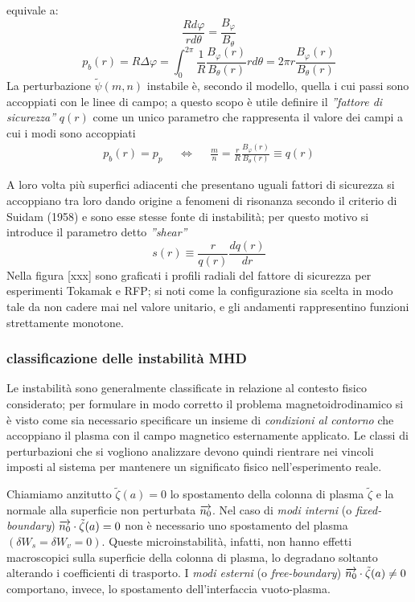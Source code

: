 equivale a: $$\frac{Rd\varphi}{rd\theta} = \frac{B_\varphi}{B_\theta}$$
$$p_b(r) = R\Delta\varphi =
\int_0^{2\pi}\frac{1}{R}\frac{B_\varphi(r)}{B_\theta(r)}rd\theta = 2\pi
r\frac{B_\varphi(r)}{B_\theta(r)}$$ La perturbazione $\tilde{\psi}(m,n)$
instabile è, secondo il modello, quella i cui passi sono accoppiati con
le linee di campo; a questo scopo è utile definire il \emph{''fattore di
sicurezza''} $q(r)$ come un unico parametro che rappresenta il valore
dei campi a cui i modi sono accoppiati
\begin{align}
 \label{sec_fact}
  p_b(r) = p_p && \Leftrightarrow &&
 \frac{m}{n} = \frac{r}{R}\frac{B_\varphi(r)}{B_\theta(r)} \equiv q(r) 
\end{align}

A loro volta più superfici adiacenti che presentano uguali fattori di
sicurezza si accoppiano tra loro dando origine a fenomeni di risonanza
secondo il criterio di Suidam (1958) e sono esse stesse fonte di
instabilità; per questo motivo si introduce il parametro detto
\emph{''shear''}
\begin{equation}
 s(r) \equiv \frac{r}{q(r)}\frac{dq(r)}{dr}
\end{equation}
Nella figura [xxx] sono graficati i profili radiali del fattore di
sicurezza per esperimenti Tokamak e RFP; si noti come la configurazione
sia scelta in modo tale da non cadere mai nel valore unitario, e gli
andamenti rappresentino funzioni strettamente monotone.

\subsubsection{classificazione delle instabilità MHD}
Le instabilità sono generalmente classificate in relazione al contesto
fisico considerato; per formulare in modo corretto il problema
magnetoidrodinamico si è visto come sia necessario specificare un insieme
di \emph{condizioni al contorno} che accoppiano il plasma con il campo
magnetico esternamente applicato. Le classi di perturbazioni che si
vogliono analizzare devono quindi rientrare nei vincoli imposti al
sistema per mantenere un significato fisico nell'esperimento reale.

Chiamiamo anzitutto $\tilde{\zeta}(a)=0 $ lo spostamento della colonna
di plasma $\tilde{\zeta}$ e la normale alla superficie non perturbata
$\overrightarrow{n_0}$. Nel caso di \emph{modi interni} (o
\emph{fixed-boundary}) $\overrightarrow{n_0}\cdot\tilde{\zeta}(a) = 0$ non è
necessario uno spostamento del plasma $(\delta W_s = \delta W_v =
0)$. Queste microinstabilità, infatti, non hanno effetti macroscopici
sulla superficie della colonna di plasma, lo degradano soltanto
alterando i coefficienti di trasporto.  I \emph{modi esterni} (o
\emph{free-boundary}) $\overrightarrow{n_0}\cdot\tilde{\zeta}(a)\neq 0$
comportano, invece, lo spostamento dell'interfaccia vuoto-plasma.

